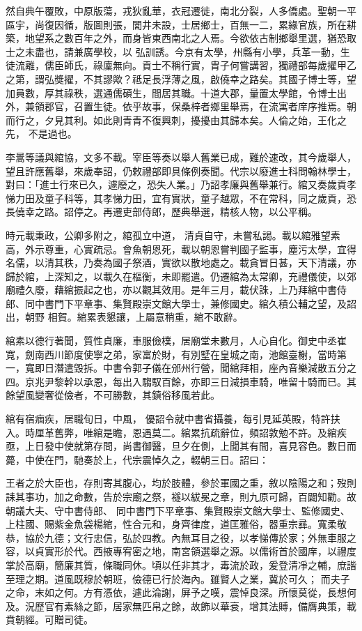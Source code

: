 \begin{pinyinscope}
 然自典午覆敗，中原版蕩，戎狄亂華，衣冠遷徙，南北分裂，人多僑處。聖朝一平區宇，尚復因循，版圖則張，閭井未設，士居鄉士，百無一二，累緣官族，所在耕築，地望系之數百年之外，而身皆東西南北之人焉。今欲依古制鄉舉里選，猶恐取士之未盡也，請兼廣學校，以
 弘訓誘。今京有太學，州縣有小學，兵革一動，生徒流離，儒臣師氏，祿廩無向。貢士不稱行實，胄子何嘗講習，獨禮部每歲擢甲乙之第，謂弘獎擢，不其謬歟？祗足長浮薄之風，啟僥幸之路矣。其國子博士等，望加員數，厚其祿秩，選通儒碩生，間居其職。十道大郡，量置太學館，令博士出外，兼領郡官，召置生徒。依乎故事，保桑梓者鄉里舉焉，在流寓者庠序推焉。朝而行之，夕見其利。如此則青青不復興刺，擾擾由其歸本矣。人倫之始，王化之先，
 不是過也。



 李暠等議與綰協，文多不載。宰臣等奏以舉人舊業已成，難於速改，其今歲舉人，望且許應舊舉，來歲奉詔，仍敕禮部即具條例奏聞。代宗以廢進士科問翰林學士，對曰：「進士行來已久，遽廢之，恐失人業。」乃詔孝廉與舊舉兼行。綰又奏歲貢孝悌力田及童子科等，其孝悌力田，宜有實狀，童子越眾，不在常科，同之歲貢，恐長僥幸之路。詔停之。再遷吏部侍郎，歷典舉選，精核人物，以公平稱。



 時元載秉政，公卿多附之，綰孤立中道，
 清貞自守，未嘗私謁。載以綰雅望素高，外示尊重，心實疏忌。會魚朝恩死，載以朝恩嘗判國子監事，塵污太學，宜得名儒，以清其秩，乃奏為國子祭酒，實欲以散地處之。載貪冒日甚，天下清議，亦歸於綰，上深知之，以載久在樞衡，未即罷遣。仍遷綰為太常卿，充禮儀使，以郊廟禮久廢，藉綰振起之也，亦以觀其效用。是年三月，載伏誅，上乃拜綰中書侍郎、同中書門下平章事、集賢殿崇文館大學士，兼修國史。綰久積公輔之望，及詔出，朝野
 相賀。綰累表懇讓，上屬意稍重，綰不敢辭。



 綰素以德行著聞，質性貞廉，車服儉樸，居廟堂未數月，人心自化。御史中丞崔寬，劍南西川節度使寧之弟，家富於財，有別墅在皇城之南，池館臺榭，當時第一，寬即日潛遣毀拆。中書令郭子儀在邠州行營，聞綰拜相，座內音樂減散五分之四。京兆尹黎幹以承恩，每出入騶馭百餘，亦即三日減損車騎，唯留十騎而已。其餘望風變奢從儉者，不可勝數，其鎮俗移風若此。



 綰有宿痼疾，居職旬日，中風，
 優詔令就中書省攝養，每引見延英殿，特許扶入。時厘革舊弊，唯綰是瞻，恩遇莫二。綰累抗疏辭位，頻詔敦勉不許。及綰疾亟，上日發中使就第存問，尚書御醫，旦夕在側，上聞其有間，喜見容色。數日而薨，中使在門，馳奏於上，代宗震悼久之，輟朝三日。詔曰：



 王者之於大臣也，存則寄其腹心，均於肢體，參於軍國之重，敘以陰陽之和；歿則誄其事功，加之命數，告於宗廟之祭，襚以紱冕之章，則九原可歸，百闢知勸。故朝議大夫、守中書侍郎、
 同中書門下平章事、集賢殿崇文館大學士、監修國史、上柱國、賜紫金魚袋楊綰，性合元和，身齊律度，道匡雅俗，器重宗彞。寬柔敬恭，協於九德；文行忠信，弘於四教。內無耳目之役，以孝悌傳於家；外無車服之容，以貞實形於代。西掖專宥密之地，南宮領選舉之源。以儒術首於國庠，以禮度掌於高廟，簡廉其質，條職同休。頃以任非其才，毒流於政，爰登清凈之輔，庶諧至理之期。道風既穆於朝班，儉德已行於海內。雖賢人之業，冀於可久；
 而夫子之命，末如之何。方有憑依，遽此淪謝，屏予之嘆，震悼良深。所懷莫從，長想何及。況歷官有素絲之節，居家無匹帛之餘，故飾以華袞，增其法賻，備膺典策，載賁朝經。可贈司徒。




\end{pinyinscope}
